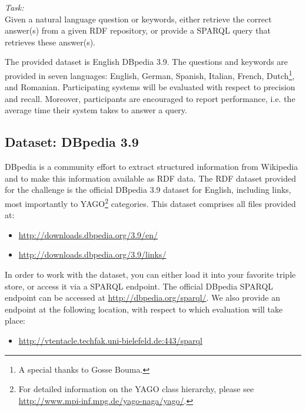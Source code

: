 
\emph{Task:} \\
Given a natural language question or keywords, either retrieve the correct answer(s) from a given RDF repository, or provide a SPARQL query that retrieves these answer(s). 

The provided dataset is English DBpedia 3.9. 
The questions and keywords are provided in seven languages: English, German, Spanish, Italian, French, Dutch\footnote{A special thanks to Gosse Bouma.}, and Romanian. 
Participating systems will be evaluated with respect to precision and recall. 
Moreover, participants are encouraged to report performance, i.e. the average time their system takes to answer a query.


\subsection{Dataset: DBpedia 3.9}
\label{sec:dbpedia}

DBpedia is a community effort to extract structured information from Wikipedia and to make this information available as RDF data. 
The RDF dataset provided for the challenge is the official DBpedia 3.9 dataset for English, including links, most importantly to YAGO\footnote{For detailed information on the YAGO class hierarchy, please see \url{http://www.mpi-inf.mpg.de/yago-naga/yago/}.} categories. This dataset comprises all files provided at: 
\begin{itemize}
\item \url{http://downloads.dbpedia.org/3.9/en/}
\item \url{http://downloads.dbpedia.org/3.9/links/}
\end{itemize}
In order to work with the dataset, you can either load it into your favorite triple store, or access it via a SPARQL endpoint. 
The official DBpedia SPARQL endpoint can be accessed at \url{http://dbpedia.org/sparql/}. 
We also provide an endpoint at the following location, with respect to which evaluation will take place:
\begin{itemize} 
\item[] \url{http://vtentacle.techfak.uni-bielefeld.de:443/sparql}
\end{itemize}

